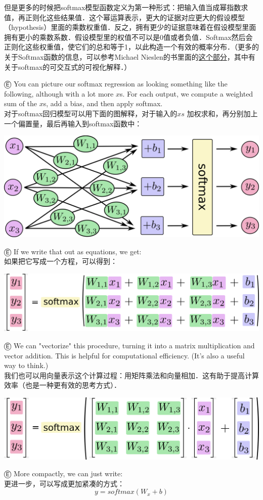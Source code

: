但是更多的时候把softmax模型函数定义为第一种形式：把输入值当成幂指数求值，再正则化这些结果值．这个幂运算表示，更大的证据对应更大的假设模型（hypothesis）里面的乘数权重值．反之，拥有更少的证据意味着在假设模型里面拥有更小的乘数系数．假设模型里的权值不可以是0值或者负值．Softmax然后会正则化这些权重值，使它们的总和等于1，以此构造一个有效的概率分布．（更多的关于Softmax函数的信息，可以参考Michael Nieslen的书里面的\href{http://neuralnetworksanddeeplearning.com/chap3.html#softmax}{这个部分}，其中有关于softmax的可交互式的可视化解释．）

Ⓔ You can picture our softmax regression as looking something like the following, although with a lot more $x$s. For each output, we compute a weighted sum of the $x$s, add a bias, and then apply softmax.\\
对于softmax回归模型可以用下面的图解释，对于输入的$xs$ 加权求和，再分别加上一个偏置量，最后再输入到softmax函数中：
\begin{center}
\includegraphics[width=.65\textwidth]{../SOURCE/images/softmax-regression-scalargraph.png}
\end{center}
Ⓔ If we write that out as equations, we get:\\
如果把它写成一个方程，可以得到：
\begin{center}
\includegraphics[width=.68\textwidth]{../SOURCE/images/softmax-regression-scalarequation.png}
\end{center}
Ⓔ We can "vectorize" this procedure, turning it into a matrix multiplication and vector addition. This is helpful for computational efficiency. (It's also a useful way to think.)\\
我们也可以用向量表示这个计算过程：用矩阵乘法和向量相加．这有助于提高计算效率（也是一种更有效的思考方式）．
\begin{center}
\includegraphics[width=.68\textwidth]{../SOURCE/images/softmax-regression-vectorequation.png}
\end{center}
Ⓔ More compactly, we can just write:\\
更进一步，可以写成更加紧凑的方式：
\begin{equation}
y = softmax(W_x+b)
\end{equation}

